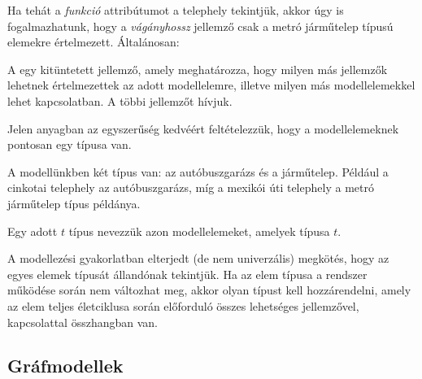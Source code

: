 Ha tehát a \textit{funkció} attribútumot a telephely  tekintjük, akkor úgy is fogalmazhatunk, hogy a \textit{vágányhossz} jellemző csak a \textsf{metró járműtelep} típusú elemekre értelmezett. Általánosan:

\begin{definicio}	
	A  egy kitüntetett jellemző, amely meghatározza, hogy milyen más jellemzők lehetnek értelmezettek az adott modellelemre, illetve milyen más modellelemekkel lehet kapcsolatban. A többi jellemzőt  hívjuk.

\begin{megjegyzes}
	Jelen anyagban az egyszerűség kedvéért feltételezzük, hogy a modellelemeknek pontosan egy típusa van.
\end{megjegyzes}
\end{definicio}


A modellünkben két típus van: az \textsf{autóbuszgarázs} és a \textsf{járműtelep}. Például a cinkotai telephely az \textsf{autóbuszgarázs}, míg a mexikói úti telephely a \textsf{metró járműtelep} típus példánya.

\begin{definicio}
Egy adott $t$ típus  nevezzük azon modellelemeket, amelyek típusa $t$.
\end{definicio}

A modellezési gyakorlatban elterjedt (de nem univerzális) megkötés, hogy az egyes elemek típusát állandónak tekintjük. Ha az elem típusa a rendszer működése során nem változhat meg, akkor olyan típust kell hozzárendelni, amely az elem teljes életciklusa során előforduló összes lehetséges jellemzővel, kapcsolattal összhangban van.

\subsection{Gráfmodellek}

